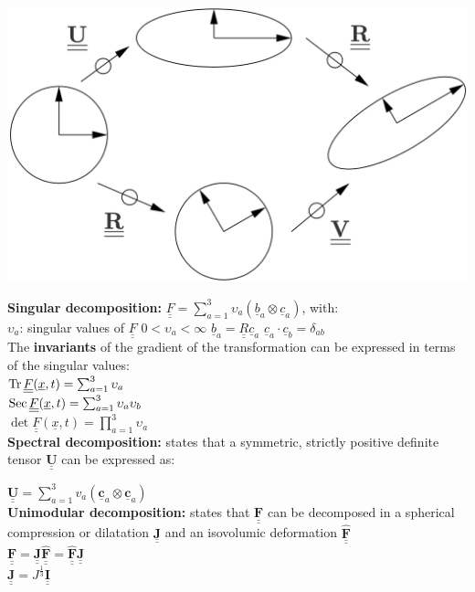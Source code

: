 \begin{center}
\includegraphics[width=0.6\linewidth]{img/PolarDecomp} \\
\end{center}

\textbf{Singular decomposition:} $ \underline{\underline{F}} =  \sum_{a=1}^{3} \upsilon_a (\underline{b}_a \otimes \underline{c}_a) $, with: \\
$\upsilon_a$: singular values of $\underline{\underline{F}}$ \quad $ 0 < \upsilon_a < \infty$ \quad $\underline{b}_a = \underline{\underline{R}} \underline{c}_a $ \quad $ \underline{c}_a \cdot \underline{c}_b = \delta_{ab} $ \\

The \textbf{invariants} of the gradient of the transformation can be expressed in terms of the singular values: \\
$\operatorname{Tr}{\underline{\underline{F}}(\underline{x},t)} = \sum_{a=1}^{3} \upsilon_a$ \\
$\operatorname{Sec}{\underline{\underline{F}}(\underline{x},t)} = \sum_{a=1}^{3} \upsilon_a \upsilon_b $ \\
$\det{\underline{\underline{F}}(\underline{x},t)} = \prod_{a=1}^{3} \upsilon_a $ \\


\textbf{Spectral decomposition:} states that a symmetric, strictly positive definite tensor ${\underline{\underline{\mathbf{U}}}}$ can be expressed as:

${\underline{\underline{\mathbf{U}}}} = \sum \limits_{a=1}^{3} v_a (\mathbf{\underline{c}}_{a} \otimes \mathbf{\underline{c}}_{a})$ \\

\textbf{Unimodular decomposition:} states that ${\underline{\underline{\mathbf{F}}}}$ can be decomposed in a spherical compression or dilatation ${\underline{\underline{\mathbf{J}}}}$ and an isovolumic deformation ${\underline{\underline{\mathbf{\hat{F}}}}}$ \\

${\underline{\underline{\mathbf{F}}}} = {\underline{\underline{\mathbf{J}}}} {\underline{\underline{\mathbf{\hat{F}}}}} = {\underline{\underline{\mathbf{\hat{F}}}}} {\underline{\underline{\mathbf{J}}}}$ \\
${\underline{\underline{\mathbf{J}}}} = J^{\frac{1}{3}}  {\underline{\underline{\mathbf{I}}}}$ \\



